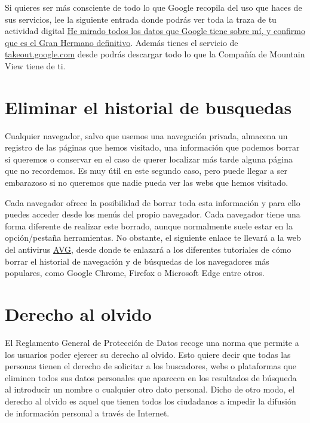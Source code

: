 \documentclass[
  spanish,
  a4paper,
  openany]{book}
\begin{document}
Si quieres ser más consciente de todo lo que Google recopila del uso que haces de sus servicios, lee la siguiente entrada donde podrás ver toda la traza de tu actividad digital \href{https://www.xataka.com/privacidad/he-mirado-todos-datos-que-google-tiene-mi-confirmo-que-gran-hermano-definitivo-2}{He mirado todos los datos que Google tiene sobre mí, y confirmo que es el Gran Hermano definitivo}. Además tienes el servicio de \href{https://takeout.google.com}{takeout.google.com} desde podrás descargar todo lo que la Compañía de Mountain View tiene de ti.

\hypertarget{eliminar-el-historial-de-busquedas}{%
\section{Eliminar el historial de busquedas}\label{eliminar-el-historial-de-busquedas}}

Cualquier navegador, salvo que usemos una navegación privada, almacena un registro de las páginas que hemos visitado, una información que podemos borrar si queremos o conservar en el caso de querer localizar más tarde alguna página que no recordemos. Es muy útil en este segundo caso, pero puede llegar a ser embarazoso si no queremos que nadie pueda ver las webs que hemos visitado.

Cada navegador ofrece la posibilidad de borrar toda esta información y para ello puedes acceder desde los menús del propio navegador. Cada navegador tiene una forma diferente de realizar este borrado, aunque normalmente suele estar en la opción/pestaña herramientas. No obstante, el siguiente enlace te llevará a la web del antivirus \href{https://www.avg.com/es/signal/how-to-clear-your-browsing-and-search-history}{AVG}, desde donde te enlazará a los diferentes tutoriales de cómo borrar el historial de navegación y de búsquedas de los navegadores más populares, como Google Chrome, Firefox o Microsoft Edge entre otros.

\hypertarget{derecho-al-olvido}{%
\section{Derecho al olvido}\label{derecho-al-olvido}}

El Reglamento General de Protección de Datos recoge una norma que permite a los usuarios poder ejercer su derecho al olvido. Esto quiere decir que todas las personas tienen el derecho de solicitar a los buscadores, webs o plataformas que eliminen todos sus datos personales que aparecen en los resultados de búsqueda al introducir un nombre o cualquier otro dato personal. Dicho de otro modo, el derecho al olvido es aquel que tienen todos los ciudadanos a impedir la difusión de información personal a través de Internet.
\end{document}
